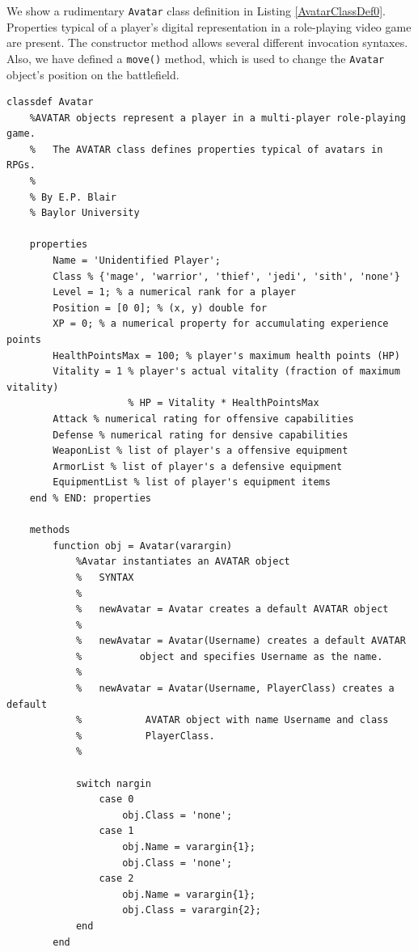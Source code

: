 We show a rudimentary \texttt{Avatar} class definition in Listing \ref{AvatarClassDef0}. Properties typical of a player's digital representation in a role-playing video game are present. The constructor method allows several different invocation syntaxes. Also, we have defined a \texttt{move()} method, which is used to change the \texttt{Avatar} object's position on the battlefield.
\begin{lstlisting}[style=Matlab-editor, label=AvatarClassDef0, caption={An initial class definition file for the \texttt{Avatar} class.}]
classdef Avatar
    %AVATAR objects represent a player in a multi-player role-playing game.
    %   The AVATAR class defines properties typical of avatars in RPGs.
    %
    % By E.P. Blair
    % Baylor University
    
    properties
        Name = 'Unidentified Player';
        Class % {'mage', 'warrior', 'thief', 'jedi', 'sith', 'none'}
        Level = 1; % a numerical rank for a player
        Position = [0 0]; % (x, y) double for
        XP = 0; % a numerical property for accumulating experience points
        HealthPointsMax = 100; % player's maximum health points (HP)
        Vitality = 1 % player's actual vitality (fraction of maximum vitality)
                     % HP = Vitality * HealthPointsMax
        Attack % numerical rating for offensive capabilities
        Defense % numerical rating for densive capabilities
        WeaponList % list of player's a offensive equipment
        ArmorList % list of player's a defensive equipment
        EquipmentList % list of player's equipment items
    end % END: properties
    
    methods
        function obj = Avatar(varargin)
            %Avatar instantiates an AVATAR object
            %   SYNTAX
            %
            %   newAvatar = Avatar creates a default AVATAR object
            %
            %   newAvatar = Avatar(Username) creates a default AVATAR
            %          object and specifies Username as the name.
            %
            %   newAvatar = Avatar(Username, PlayerClass) creates a default
            %           AVATAR object with name Username and class
            %           PlayerClass.
            %
            
            switch nargin
                case 0
                    obj.Class = 'none';
                case 1
                    obj.Name = varargin{1};
                    obj.Class = 'none';
                case 2
                    obj.Name = varargin{1};
                    obj.Class = varargin{2};
            end
        end
        

\end{lstlisting}
